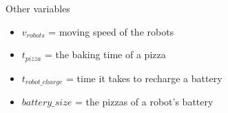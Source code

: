 \begin{frame}{Other variables}
    \begin{itemize}
        \item $v_{robots}$ = moving speed of the robots
        \item $t_{pizza}$ = the baking time of a pizza
        \item $t_{robot\_charge}$ = time it takes to recharge a battery
        \item $battery\_size$ = the pizzas of a robot's battery
    \end{itemize}
\end{frame}
